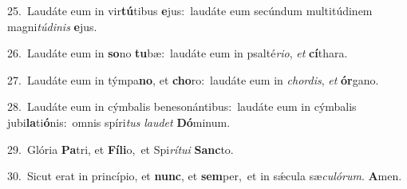 {\numbfont\textcolor{\numbcolor}{25.}}~Laudáte eum in vir\-\textbf{tú}\-tibus \textbf{e}\-jus:~\star laudáte eum secúndum multitúdinem magni\-\textit{tú}\-\textit{di}\textit{nis} \textbf{e}\-jus.\par
{\numbfont\textcolor{\numbcolor}{26.}}~Laudáte eum in \textbf{so}\-no \textbf{tu}\-bæ:~\star laudáte eum in psalté\-\textit{ri}\-\textit{o}, \textit{et} \textbf{cí}\-thara.\par
{\numbfont\textcolor{\numbcolor}{27.}}~Laudáte eum in týmpa\-\textbf{no}\-, et \textbf{cho}\-ro:~\star laudáte eum in \textit{chor}\-\textit{dis}, \textit{et} \textbf{ór}\-gano.\par
{\numbfont\textcolor{\numbcolor}{28.}}~Laudáte eum in cýmbalis benesonántibus:~\dagger laudáte eum in cýmbalis jubi\-\textbf{la}\-ti\-\textbf{ó}\-nis:~\star omnis spíri\textit{tus} \textit{lau}\-\textit{det} \textbf{Dó}\-minum.\par
{\numbfont\textcolor{\numbcolor}{29.}}~Glória \textbf{Pa}\-tri, et \textbf{Fí}\-\textbf{li}o,~\star et Spi\-\textit{rí}\-\textit{tu}\textit{i} \textbf{Sanc}\-to.\par
{\numbfont\textcolor{\numbcolor}{30.}}~Sicut erat in princípio, et \textbf{nunc}\-, et \textbf{sem}\-per,~\star et in sǽcula sæ\-\textit{cu}\-\textit{ló}\textit{rum}. \textbf{A}\-men.\par
